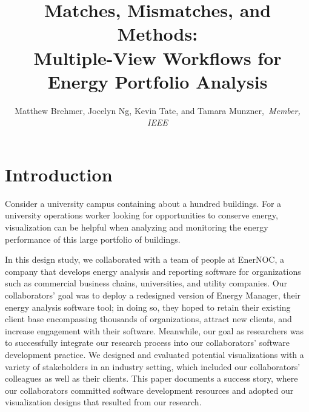 \documentclass[journal]{vgtc}                %
\title{Matches, Mismatches, and Methods: \\ Multiple-View Workflows for Energy Portfolio Analysis}
\author{Matthew Brehmer, Jocelyn Ng, Kevin Tate, and Tamara Munzner,~\textit{Member, IEEE}}
\begin{document}

\maketitle



\section{Introduction}
\label{introduction}


Consider a university campus containing about a hundred buildings. 
For a university operations worker looking for opportunities to conserve energy, visualization can be helpful when analyzing and monitoring the energy performance of this large portfolio of buildings. 

In this design study, we collaborated with a team of people at EnerNOC, a company that develops energy analysis and reporting software for organizations such as commercial business chains, universities, and utility companies.
Our collaborators' goal was to deploy a redesigned version of Energy Manager, their energy analysis software tool; in doing so, they hoped to retain their existing client base encompassing thousands of organizations, attract new clients, and increase engagement with their software. 
Meanwhile, our goal as researchers was to successfully integrate our research process into our collaborators' software development practice.
We designed and evaluated potential visualizations with a variety of stakeholders in an industry setting, which included our collaborators' colleagues as well as their clients.
This paper documents a success story, where our collaborators committed software development resources and adopted our visualization designs that resulted from our research.
\end{document}
